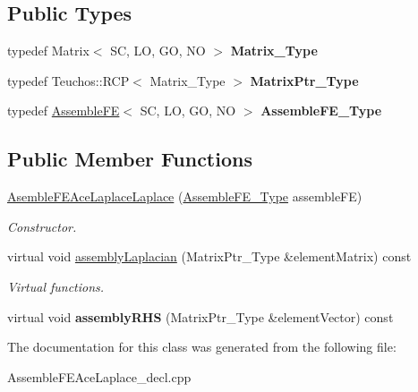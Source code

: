 \subsection*{Public Types}
\begin{DoxyCompactItemize}
\item 
\mbox{\label{classFEDD_1_1AssembleFEAceLaplaceLaplace_a959301b33c3ea8396e016342e11df27e}} 
typedef Matrix$<$ SC, LO, GO, NO $>$ {\bfseries Matrix\+\_\+\+Type}
\item 
\mbox{\label{classFEDD_1_1AssembleFEAceLaplaceLaplace_a8dd19aa5a2e0724d80b2b6111fc721cc}} 
typedef Teuchos\+::\+R\+CP$<$ Matrix\+\_\+\+Type $>$ {\bfseries Matrix\+Ptr\+\_\+\+Type}
\item 
\mbox{\label{classFEDD_1_1AssembleFEAceLaplaceLaplace_aac820670095952a7e3a58d3d29e64008}} 
typedef \hyperlink{classFEDD_1_1AssembleFE}{Assemble\+FE}$<$ SC, LO, GO, NO $>$ {\bfseries Assemble\+F\+E\+\_\+\+Type}
\end{DoxyCompactItemize}
\subsection*{Public Member Functions}
\begin{DoxyCompactItemize}
\item 
\mbox{\label{classFEDD_1_1AssembleFEAceLaplaceLaplace_a4d2dd4b731ef8f5af1d9d4351a273359}} 
\hyperlink{classFEDD_1_1AssembleFEAceLaplaceLaplace_a4d2dd4b731ef8f5af1d9d4351a273359}{Asemble\+F\+E\+Ace\+Laplace\+Laplace} (\hyperlink{classFEDD_1_1AssembleFE}{Assemble\+F\+E\+\_\+\+Type} assemble\+FE)
\begin{DoxyCompactList}\small\item\em Constructor. \end{DoxyCompactList}\item 
\mbox{\label{classFEDD_1_1AssembleFEAceLaplaceLaplace_a74ea702021c5caaac68877d5c019a0c9}} 
virtual void \hyperlink{classFEDD_1_1AssembleFEAceLaplaceLaplace_a74ea702021c5caaac68877d5c019a0c9}{assembly\+Laplacian} (Matrix\+Ptr\+\_\+\+Type \&element\+Matrix) const
\begin{DoxyCompactList}\small\item\em Virtual functions. \end{DoxyCompactList}\item 
\mbox{\label{classFEDD_1_1AssembleFEAceLaplaceLaplace_a970372bdca95a30c3ce4485626c04058}} 
virtual void {\bfseries assembly\+R\+HS} (Matrix\+Ptr\+\_\+\+Type \&element\+Vector) const
\end{DoxyCompactItemize}


The documentation for this class was generated from the following file\+:\begin{DoxyCompactItemize}
\item 
Assemble\+F\+E\+Ace\+Laplace\+\_\+decl.\+cpp\end{DoxyCompactItemize}
